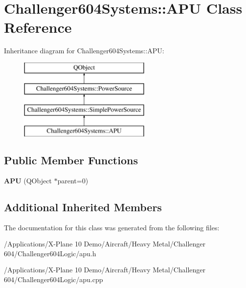 \hypertarget{class_challenger604_systems_1_1_a_p_u}{\section{Challenger604\-Systems\-:\-:A\-P\-U Class Reference}
\label{class_challenger604_systems_1_1_a_p_u}
}
Inheritance diagram for Challenger604\-Systems\-:\-:A\-P\-U\-:\begin{figure}[H]
\begin{center}
\leavevmode
\includegraphics[height=4.000000cm]{class_challenger604_systems_1_1_a_p_u}
\end{center}
\end{figure}
\subsection*{Public Member Functions}
\begin{DoxyCompactItemize}
\item 
\hypertarget{class_challenger604_systems_1_1_a_p_u_aaa90feec507ea4f9b5eff275d2f040da}{{\bfseries A\-P\-U} (Q\-Object $\ast$parent=0)}\label{class_challenger604_systems_1_1_a_p_u_aaa90feec507ea4f9b5eff275d2f040da}

\end{DoxyCompactItemize}
\subsection*{Additional Inherited Members}


The documentation for this class was generated from the following files\-:\begin{DoxyCompactItemize}
\item 
/\-Applications/\-X-\/\-Plane 10 Demo/\-Aircraft/\-Heavy Metal/\-Challenger 604/\-Challenger604\-Logic/apu.\-h\item 
/\-Applications/\-X-\/\-Plane 10 Demo/\-Aircraft/\-Heavy Metal/\-Challenger 604/\-Challenger604\-Logic/apu.\-cpp\end{DoxyCompactItemize}

